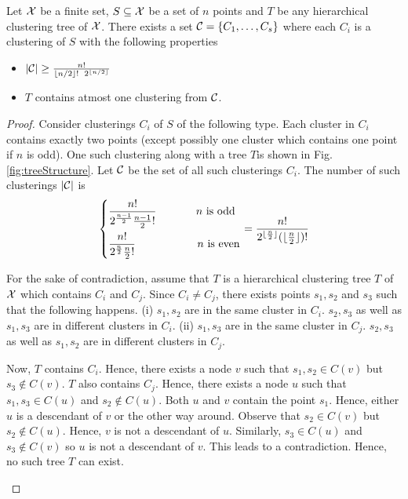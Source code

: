 \begin{lem}
\label{lemma:treesOnX}
Let $\mathcal X$ be a finite set, $S \subseteq \mathcal X$ be a set of $n$ points and $T$ be any hierarchical clustering tree of $\mathcal X$. There exists a set $\mathcal C = \{C_1, \ldots, C_s\}$ where each $C_i$ is a clustering of $S$ with the following properties
\begin{itemize} 
	\item $|\mathcal C| \ge \frac{n!}{\lfloor n/2 \rfloor! \enspace 2^{\lfloor n/2 \rfloor}}$
	\item $T$ contains atmost one clustering from $\mathcal C$. 
\end{itemize}
\end{lem}
\begin{proof}
Consider clusterings $C_i$ of $S$ of the following type. Each cluster in $C_i$ contains exactly two points (except possibly one cluster which contains one point if $n$ is odd). One such clustering along with a tree $T$is shown in Fig. \ref{fig:treeStructure}. Let $\mathcal C$ be the set of all such clusterings $C_i$. The number of such clusterings $|\mathcal C|$ is 
$$ \begin{dcases}
		\frac{n!}{2^{\frac{n-1}{2}}\frac{n-1}{2}!} \hspace{0.5in} n \text{ is odd}\\
        \frac{n!}{2^{\frac{n}{2}}\frac{n}{2}!} \hspace{0.78in} n \text{ is even}\\
	\end{dcases}= \frac{n!}{2^{\lfloor \frac{n}{2} \rfloor} (\lfloor \frac{n}{2} \rfloor)!}$$
	
For the sake of contradiction, assume that $T$ is a hierarchical clustering tree $T$ of $\mathcal X$ which contains $C_i$ and $C_j$. Since $C_i \neq C_j$, there exists points $s_1, s_2$ and $s_3$ such that the following happens. (i) $s_1, s_2$ are in the same cluster in $C_i$. $s_2, s_3$ as well as $s_1, s_3$ are in different clusters in $C_i$. (ii) $s_1, s_3$ are in the same cluster in $C_j$. $s_2, s_3$ as well as $s_1, s_2$ are in different clusters in $C_j$.   

Now, $T$ contains $C_i$. Hence, there exists a node $v$ such that $s_1, s_2 \in C(v)$ but $s_3 \not\in C(v)$. $T$ also contains $C_j$. Hence, there exists a node $u$ such that $s_1, s_3 \in C(u)$ and $s_2 \not\in C(u)$. Both $u$ and $v$ contain the point $s_1$. Hence, either $u$ is a descendant of $v$ or the other way around. Observe that $s_2 \in C(v)$ but $s_2 \not\in C(u)$. Hence, $v$ is not a descendant of $u$. Similarly, $s_3 \in C(u)$ and $s_3 \not\in C(v)$ so $u$ is not a descendant of $v$. This leads to a contradiction. Hence, no such tree $T$ can exist.  
\begin{figure}
	\centering
\end{figure}
\end{proof}
